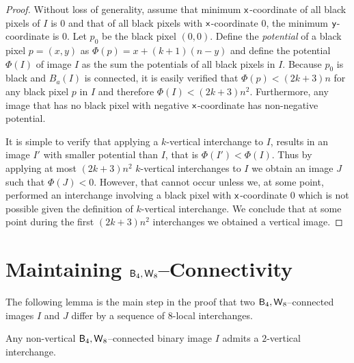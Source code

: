 \documentclass[lotsofwhite,charterfonts]{patmorin}
\newcommand{\foureight}{\ensuremath{\protect\textup{\textsf{B}}_{4},\protect\textup{\textsf{W}}_{8}}}
\newcommand{\x}{\ensuremath{\protect\textup{\textsf{x}}}}
\newcommand{\y}{\ensuremath{\protect\textup{\textsf{y}}}}
\begin{document}
\begin{proof} 

Without loss of generality, assume that minimum \x-coordinate of all
black pixels of $I$ is 0 and that of all black pixels with
\x-coordinate 0, the minimum \y-coordinate is 0.  Let $p_0$ be the
black pixel $(0,0)$. Define the \emph{potential} of a black pixel
$p=(x,y)$ as $\Phi(p)=x +(k+1)(n-y)$ and define the potential
$\Phi(I)$ of image $I$ as the sum the potentials of all black pixels
in $I$.  Because $p_0$ is black and $B_a(I)$ is connected, it is
easily verified that $\Phi(p)< (2k+3)n$ for any black pixel $p$ in $I$
and therefore $\Phi(I)< (2k+3)n^2$. Furthermore, any image that has no
black pixel with negative \x-coordinate has non-negative potential.

It is simple to verify that applying a $k$-vertical interchange to
$I$, results in an image $I'$ with smaller potential than $I$, that is
$\Phi(I')<\Phi(I)$. Thus by applying at most $(2k+3)n^2$ $k$-vertical
interchanges to $I$ we obtain an image $J$ such that $\Phi(J)< 0$.
However, that cannot occur unless we, at some point, performed an
interchange involving a black pixel with \x-coordinate $0$ which is
not possible given the definition of $k$-vertical interchange.  We
conclude that at some point during the first $(2k+3)n^2$ interchanges
we obtained a vertical image.
\end{proof}



\section{Maintaining $\foureight$--Connectivity}


The following lemma is the main step in the proof that two
\foureight--connected images $I$ and $J$ differ by a sequence of
$8$-local interchanges.  

\begin{lem}
Any non-vertical $\foureight$--connected binary image $I$ admits a $2$-vertical interchange.
\end{lem}
\end{document}
